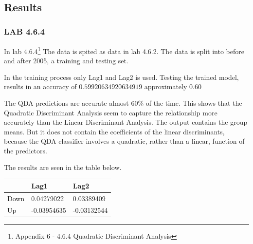 \subsection{Results}
\subsubsection*{LAB 4.6.4}
In lab 4.6.4\footnote{Appendix 6 - 4.6.4 Quadratic Discriminant Analysis} The data is spited as data in lab 4.6.2. The data is split into before and after 2005, a training and testing set.

In the training process only Lag1 and Lag2 is used. Testing the trained model, results in an accuracy of $0.59920634920634919$ approximately $0.60$

The QDA predictions are accurate almost $60\%$ of the time. This shows that the Quadratic Discriminant Analysis seem to capture the relationship more accurately than the Linear Discriminant Analysis. The output contains the group means. But it does not contain the coefficients of the linear discriminants, because the QDA classifier involves a quadratic, rather than a linear, function of the predictors.

The results are seen in the table below.

\begin{longtable}[]{@{}lll@{}}
	\toprule
	& Lag1 & Lag2\tabularnewline
	\midrule
	\endhead
	Down & 0.04279022 & 0.03389409\tabularnewline
	Up & -0.03954635 & -0.03132544\tabularnewline
	\bottomrule
\end{longtable}